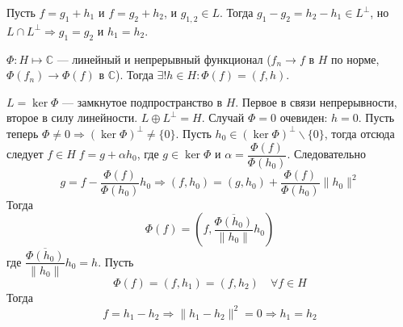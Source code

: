 \documentclass[14pt]{extarticle}
\begin{document}
Пусть $f = g_1 + h_1$ и $f = g_2 + h_2$, и $g_{1,2} \in L$.
Тогда $g_1 - g_2 = h_2 - h_1 \in L^\perp$, но $L \cap L^\perp\Rightarrow g_1 = g_2$ и $h_1 = h_2$.

\begin{Theor}
    $\Phi:H \mapsto \mathbb C$ --- линейный и непрерывный функционал ($f_n \to f$ в $H$ по норме, $\Phi(f_n) \to \Phi(f)$ в $\mathbb C$).
    Тогда $\exists! h \in H\colon \Phi(f) = (f,h)$.
\end{Theor}
\begin{Proof}
    $L = \ker \Phi$ --- замкнутое подпространство в $H$.
    Первое в связи непрерывности, второе в силу линейности.
    $L \oplus L^\perp = H$.
    Случай $\Phi = 0$ очевиден: $h = 0$.
    Пусть теперь $\Phi \ne 0\Rightarrow (\ker\Phi)^\perp \ne \{0\}$.
    Пусть $h_0 \in (\ker\Phi)^\perp\backslash\{0\}$, тогда отсюда следует $f \in H\;f = g +\alpha h_0$,
    где $g \in \ker \Phi$ и $\alpha = \dfrac{\Phi(f)}{\Phi(h_0)}$.
    Следовательно
    $$
    g = f - \dfrac{\Phi(f)}{\Phi(h_0)}h_0\Rightarrow (f,h_0) = (g, h_0) + \dfrac{\Phi(f)}{\Phi(h_0)}\|h_0\|^2
    $$
    Тогда
    $$
    \Phi(f) = (f, \dfrac{\overline{\Phi(h_0)}}{\|h_0\|}h_0)
    $$
    где $\dfrac{\overline{\Phi(h_0)}}{\|h_0\|}h_0 = h$.
    Пусть
    $$
    \Phi(f) = (f, h_1) = (f, h_2)\quad\forall f\in H
    $$
    Тогда
    $$
    f = h_1 - h_2\Rightarrow \|h_1 - h_2\|^2 = 0\Rightarrow h_1 = h_2
    $$
\end{Proof}
\end{document}
